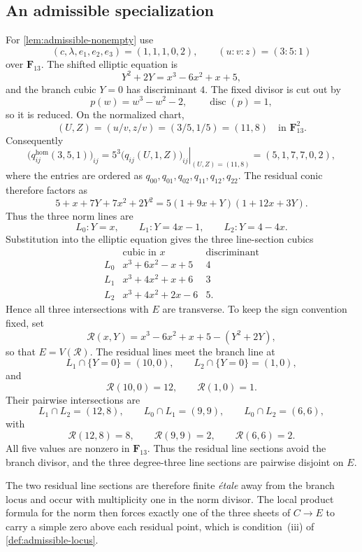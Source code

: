 \subsection{An admissible specialization}
\label{app:admissible-specialization}
For \cref{lem:admissible-nonempty} use
\[
 (c,\lambda,e_1,e_2,e_3)=(1,1,1,0,2),\qquad (u:v:z)=(3:5:1)
\]
over $\mathbf F_{13}$.  The shifted elliptic equation is
\[
 Y^2+2Y=x^3-6x^2+x+5,
\]
and the branch cubic $Y=0$ has discriminant $4$.  The fixed divisor is cut
out by
\[
 p(w)=w^3-w^2-2,
 \qquad \operatorname{disc}(p)=1,
\]
so it is reduced.  On the normalized chart,
\[
 (U,Z)=(u/v,z/v)=(3/5,1/5)=(11,8)
 \quad\text{in }\mathbf F_{13}^2.
\]
Consequently
\[
 \bigl(q_{ij}^{\mathrm{hom}}(3,5,1)\bigr)_{ij}
 =\left.5^3\bigl(q_{ij}(U,1,Z)\bigr)_{ij}
   \right|_{(U,Z)=(11,8)}
 =(5,1,7,7,0,2),
\]
where the entries are ordered as
$q_{00},q_{01},q_{02},q_{11},q_{12},q_{22}$.  The residual conic therefore
factors as
\[
 5+x+7Y+7x^2+2Y^2
 =5(1+9x+Y)(1+12x+3Y).
\]
Thus the three norm lines are
\[
 L_0:Y=x,\qquad L_1:Y=4x-1,\qquad L_2:Y=4-4x.
\]
Substitution into the elliptic equation gives the three line-section cubics
\[
\begin{array}{c|c|c}
&\text{cubic in }x&\text{discriminant}\\ \hline
L_0&x^3+6x^2-x+5&4\\
L_1&x^3+4x^2+x+6&3\\
L_2&x^3+4x^2+2x-6&5.
\end{array}
\]
Hence all three intersections with $E$ are transverse.  To keep the sign
convention fixed, set
\[
 \mathcal R(x,Y)=x^3-6x^2+x+5-(Y^2+2Y),
\]
so that $E=V(\mathcal R)$.  The residual lines meet the branch line at
\[
 L_1\cap\{Y=0\}=(10,0),\qquad
 L_2\cap\{Y=0\}=(1,0),
\]
and
\[
 \mathcal R(10,0)=12,\qquad \mathcal R(1,0)=1.
\]
Their pairwise intersections are
\[
 L_1\cap L_2=(12,8),\qquad
 L_0\cap L_1=(9,9),\qquad
 L_0\cap L_2=(6,6),
\]
with
\[
 \mathcal R(12,8)=8,\qquad
 \mathcal R(9,9)=2,\qquad
 \mathcal R(6,6)=2.
\]
All five values are nonzero in $\mathbf F_{13}$.  Thus the residual line
sections avoid the branch divisor, and the three degree-three line sections
are pairwise disjoint on $E$.

The two residual line sections are therefore finite \emph{\'etale} away from
the branch locus and occur with multiplicity one in the norm divisor.  The
local product formula for the norm then forces exactly one of the three
sheets of $C\to E$ to carry a simple zero above each residual point, which is
condition~(iii) of \cref{def:admissible-locus}.


